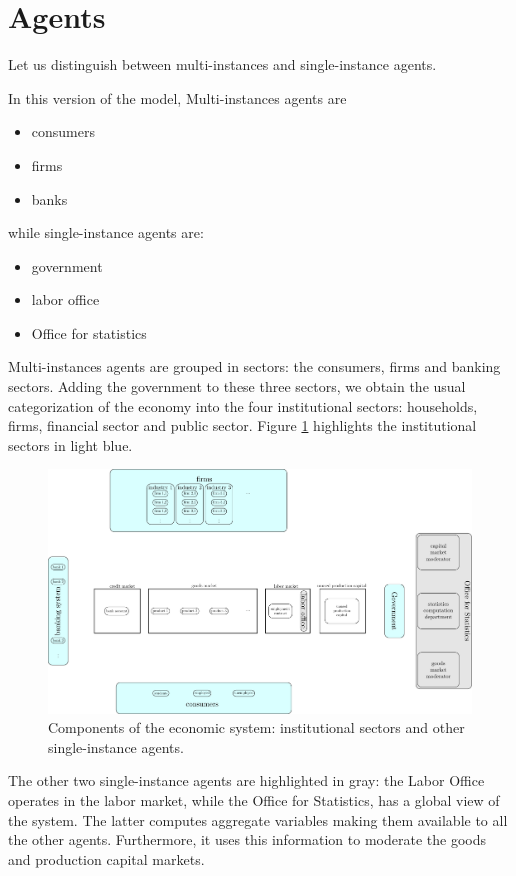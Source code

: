 \documentclass{book}
\begin{document}
\section{Agents}

Let us distinguish between multi-instances and single-instance agents.  

In this version of the model, Multi-instances agents are
\begin{itemize}
	\item consumers
	\item firms
	\item banks
\end{itemize}
while single-instance agents are:
\begin{itemize}
	\item government
	\item labor office
	\item Office for statistics
\end{itemize}

Multi-instances agents are grouped in sectors: the consumers, firms and banking sectors. Adding the government to these three sectors, we obtain the usual categorization of the economy into the four institutional sectors: households, firms, financial sector and public sector. Figure \ref{fig:componentsc1} highlights the institutional sectors in light blue.
\begin{figure}[htp]
\hskip-1cm\includegraphics[scale=0.5]{agents_and_interactions_figure1c1-0.pdf}
	\caption{Components of the economic system: institutional sectors and other single-instance agents.}
	\label{fig:componentsc1}
\end{figure}
The other two single-instance agents are highlighted in gray: the Labor Office operates in the labor market, while the Office for Statistics, has a global view of the system. The latter computes aggregate variables making them available to all the other agents. Furthermore, it uses this information to moderate the goods and production capital markets.
\end{document}
